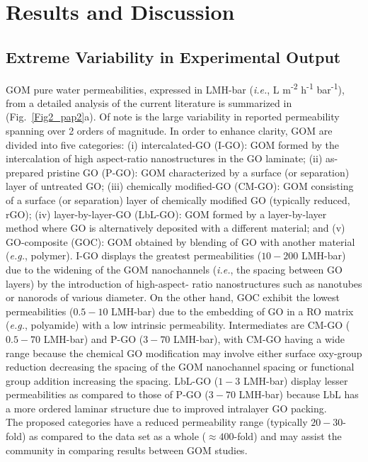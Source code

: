 \section{Results and Discussion}
\subsection{Extreme Variability in Experimental Output}
GOM pure water permeabilities, expressed in LMH-bar (\textit{i.e.}, L m\textsuperscript{-2} h\textsuperscript{-1} bar\textsuperscript{-1}), from a detailed analysis of the current literature is summarized in (Fig.~\ref{Fig2_pap2}a). Of note is the large variability in reported permeability spanning over 2 orders of magnitude. In order to enhance clarity, GOM are divided into five categories: (i) intercalated-GO (I-GO): GOM formed by the intercalation of high aspect-ratio nanostructures in the GO laminate; (ii) as-prepared pristine GO (P-GO): GOM characterized by a surface (or separation) layer of untreated GO; (iii) chemically modified-GO (CM-GO): GOM consisting of a surface (or separation) layer of chemically modified GO (typically reduced, rGO); (iv) layer-by-layer-GO (LbL-GO): GOM formed by a layer-by-layer method where GO is alternatively deposited with a different material; and (v) GO-composite (GOC): GOM obtained by blending of GO with another material (\textit{e.g.}, polymer).
I-GO displays the greatest permeabilities ($10-200$ LMH-bar) due to the widening of the GOM nanochannels (\textit{i.e.}, the spacing between GO layers) by the introduction of high-aspect- ratio nanostructures such as nanotubes or nanorods of various diameter.\cite{goh2015all,chen2016reduced,wang2014graphene,han2015high} On the other hand, GOC exhibit the lowest permeabilities ($0.5-10$ LMH-bar) due to the embedding of GO in a RO matrix (\textit{e.g.}, polyamide) with a low intrinsic permeability.\cite{safarpour2015thin,chae2015graphene} Intermediates are CM-GO ($0.5-70$ LMH-bar) and P-GO ($3-70$ LMH-bar), with CM-GO having a wide range because the chemical GO modification may involve either surface oxy-group reduction decreasing the spacing of the GOM nanochannel spacing or functional group addition increasing the spacing.\cite{Han2013,xia2015ultrathin} LbL-GO ($1-3$ LMH-bar) display lesser permeabilities as compared to those of P-GO ($3-70$ LMH-bar) because LbL has a more ordered laminar structure due to improved intralayer GO packing.\cite{choi2013layer,Hu2013}\\
The proposed categories have a reduced permeability range (typically $20-30$-fold) as compared to the data set as a whole ($\approx400$-fold) and may assist the community in comparing results between GOM studies.
